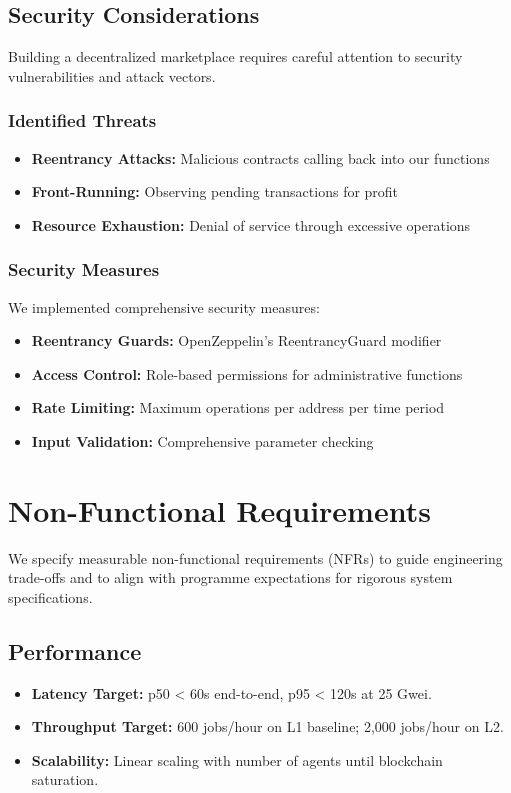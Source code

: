 \subsection{Security Considerations}

Building a decentralized marketplace requires careful attention to security vulnerabilities and attack vectors.

\subsubsection{Identified Threats}
\begin{itemize}
    \item \textbf{Reentrancy Attacks:} Malicious contracts calling back into our functions
    \item \textbf{Front-Running:} Observing pending transactions for profit
    \item \textbf{Resource Exhaustion:} Denial of service through excessive operations
\end{itemize}

\subsubsection{Security Measures}
We implemented comprehensive security measures:
\begin{itemize}
    \item \textbf{Reentrancy Guards:} OpenZeppelin's ReentrancyGuard modifier
    \item \textbf{Access Control:} Role-based permissions for administrative functions
    \item \textbf{Rate Limiting:} Maximum operations per address per time period
    \item \textbf{Input Validation:} Comprehensive parameter checking
\end{itemize}

\section{Non-Functional Requirements}

We specify measurable non-functional requirements (NFRs) to guide engineering trade-offs and to align with programme expectations for rigorous system specifications.

\subsection{Performance}
\begin{itemize}
    \item \textbf{Latency Target:} p50 < 60s end-to-end, p95 < 120s at 25 Gwei.
    \item \textbf{Throughput Target:} 600 jobs/hour on L1 baseline; 2,000 jobs/hour on L2.
    \item \textbf{Scalability:} Linear scaling with number of agents until blockchain saturation.
\end{itemize}


